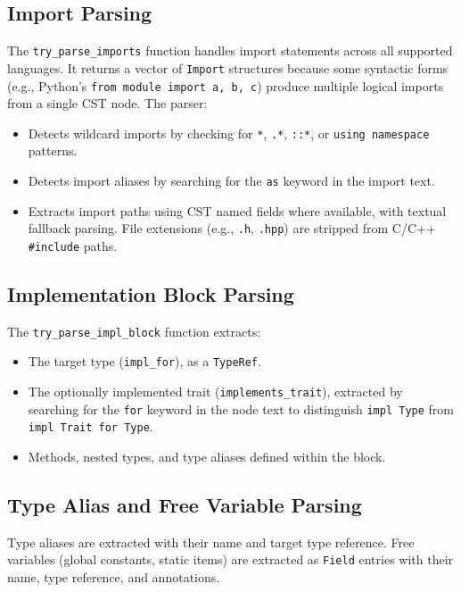 \subsection{Import Parsing}

The \texttt{try\_parse\_imports} function handles import statements
across all supported languages. It returns a vector of
\texttt{Import} structures because some syntactic forms (e.g.,
Python's \texttt{from module import a, b, c}) produce multiple
logical imports from a single CST node. The parser:
\begin{itemize}
  \item Detects wildcard imports by checking for \texttt{*},
    \texttt{.*}, \texttt{::*}, or \texttt{using namespace} patterns.
  \item Detects import aliases by searching for the \texttt{as}
    keyword in the import text.
  \item Extracts import paths using CST named fields where available,
    with textual fallback parsing. File extensions (e.g.,
    \texttt{.h}, \texttt{.hpp}) are stripped from C/C++
    \texttt{\#include} paths.
\end{itemize}

\subsection{Implementation Block Parsing}

The \texttt{try\_parse\_impl\_block} function extracts:
\begin{itemize}
  \item The target type (\texttt{impl\_for}), as a \texttt{TypeRef}.
  \item The optionally implemented trait
    (\texttt{implements\_trait}), extracted by searching for the
    \texttt{for} keyword in the node text to distinguish \texttt{impl
    Type} from \texttt{impl Trait for Type}.
  \item Methods, nested types, and type aliases defined within the block.
\end{itemize}

\subsection{Type Alias and Free Variable Parsing}

Type aliases are extracted with their name and target type reference.
Free variables (global constants, static items) are extracted as
\texttt{Field} entries with their name, type reference, and annotations.

